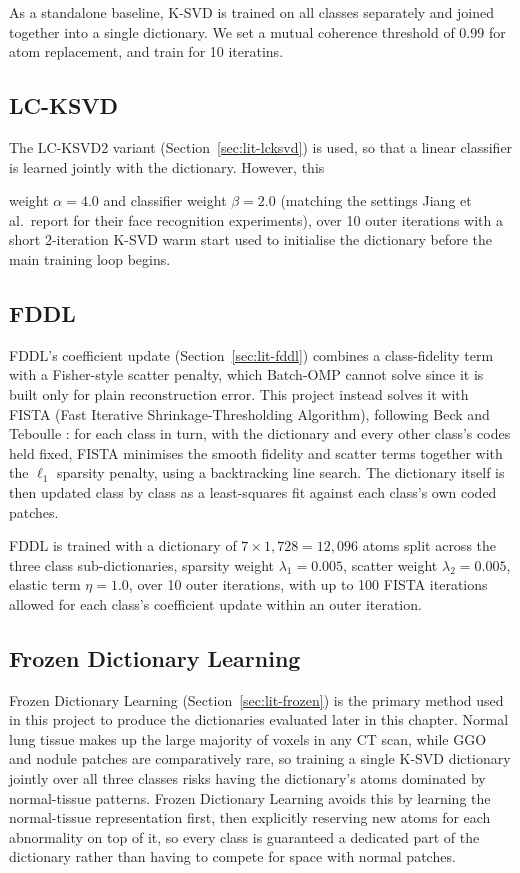 As a standalone baseline, K-SVD is trained on all classes separately and joined together into a single dictionary. 
We set a mutual coherence threshold of 0.99 for atom replacement, and train for 10 iteratins.

\subsection{LC-KSVD}

The LC-KSVD2 variant (Section~\ref{sec:lit-lcksvd}) is used, so that a
linear classifier is learned jointly with the dictionary. However, this 

weight $\alpha = 4.0$ and classifier weight $\beta = 2.0$ (matching the
settings Jiang et al.\ report for their face recognition experiments),
over 10 outer iterations with a short 2-iteration K-SVD warm start used
to initialise the dictionary before the main training loop begins.

\subsection{FDDL}

FDDL's coefficient update (Section~\ref{sec:lit-fddl}) combines a
class-fidelity term with a Fisher-style scatter penalty, which
Batch-OMP cannot solve since it is built only for plain reconstruction
error. This project instead solves it with FISTA (Fast Iterative
Shrinkage-Thresholding Algorithm), following Beck and Teboulle
\cite{beck2009fista}: for each class in turn, with the dictionary and
every other class's codes held fixed, FISTA minimises the smooth
fidelity and scatter terms together with the $\ell_1$ sparsity penalty,
using a backtracking line search. The dictionary itself is then updated
class by class as a least-squares fit against each class's own coded
patches.

FDDL is trained with a dictionary of $7 \times 1{,}728 = 12{,}096$
atoms split across the three class sub-dictionaries, sparsity weight
$\lambda_1 = 0.005$, scatter weight $\lambda_2 = 0.005$, elastic term
$\eta = 1.0$, over 10 outer iterations, with up to 100 FISTA iterations
allowed for each class's coefficient update within an outer iteration.

\subsection{Frozen Dictionary Learning}
\label{sec:frozen-dict-learning}

Frozen Dictionary Learning (Section~\ref{sec:lit-frozen}) is the
primary method used in this project to produce the dictionaries
evaluated later in this chapter. Normal lung tissue makes up the large
majority of voxels in any CT scan, while GGO and nodule patches are
comparatively rare, so training a single K-SVD dictionary jointly over
all three classes risks having the dictionary's atoms dominated by
normal-tissue patterns. Frozen Dictionary Learning avoids this by
learning the normal-tissue representation first, then explicitly
reserving new atoms for each abnormality on top of it, so every class
is guaranteed a dedicated part of the dictionary rather than having to
compete for space with normal patches.

